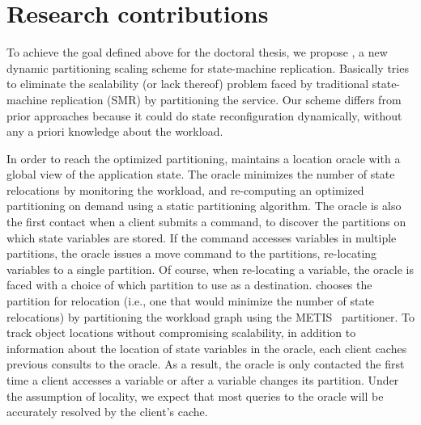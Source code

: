 
\section{Research contributions}
\label{sec:contribution}
To achieve the goal defined above for the doctoral thesis, we propose \dynastar,
a new dynamic partitioning scaling scheme for state-machine replication.
Basically \dynastar tries to eliminate the scalability (or lack thereof) problem
faced by traditional state-machine replication (SMR) by partitioning the
service. Our scheme differs from prior approaches because it could do state
reconfiguration dynamically, without any a priori knowledge about the workload.

In order to reach the optimized partitioning, \dynastar maintains a location
oracle with a global view of the application state. The oracle minimizes the
number of state relocations by monitoring the workload, and re-computing an
optimized partitioning on demand using a static partitioning algorithm. The
oracle is also the first contact when a client submits a command, to discover
the partitions on which state variables are stored. If the command accesses
variables in multiple partitions, the oracle issues a move command to the
partitions, re-locating variables to a single partition. Of course, when
re-locating a variable, the oracle is faced with a choice of which partition to
use as a destination. \dynastar chooses the partition for relocation (i.e., one
that would minimize the number of state relocations) by partitioning the
workload graph using the METIS~\cite{Abou-Rjeili:2006} partitioner. To track
object locations without compromising scalability, in addition to information
about the location of state variables in the oracle, each client caches previous
consults to the oracle. As a result, the oracle is only contacted the first time
a client accesses a variable or after a variable changes its partition. Under
the assumption of locality, we expect that most queries to the oracle will be
accurately resolved by the client's cache.

